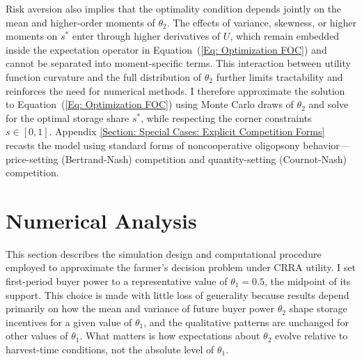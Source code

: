 Risk aversion also implies that the optimality condition depends jointly on the mean and higher-order moments of $\theta_2$. The effects of variance, skewness, or higher moments on $s^{*}$ enter through higher derivatives of $U$, which remain embedded inside the expectation operator in Equation~(\ref{Eq: Optimization FOC}) and cannot be separated into moment-specific terms. This interaction between utility function curvature and the full distribution of $\theta_2$ further limits tractability and reinforces the need for numerical methods. I therefore approximate the solution to Equation~(\ref{Eq: Optimization FOC}) using Monte Carlo draws of $\theta_2$ and solve for the optimal storage share $s^{*}$, while respecting the corner constraints $s \in [0,1]$. Appendix \ref{Section: Special Cases: Explicit Competition Forms} recasts the model using standard forms of noncooperative oligopsony behavior---price-setting (Bertrand-Nash) competition and quantity-setting (Cournot-Nash) competition.






\section{Numerical Analysis} \label{Section: Base Model Numerical Analysis} 
\noindent This section describes the simulation design and computational procedure employed to approximate the farmer's decision problem under CRRA utility. I set first-period buyer power to a representative value of $\theta_1 = 0.5$, the midpoint of its support. This choice is made with little loss of generality because results depend primarily on how the mean and variance of future buyer power $\theta_2$ shape storage incentives for a given value of $\theta_1$, and the qualitative patterns are unchanged for other values of $\theta_1$. What matters is how expectations about $\theta_2$ evolve relative to harvest-time conditions, not the absolute level of $\theta_1$.

